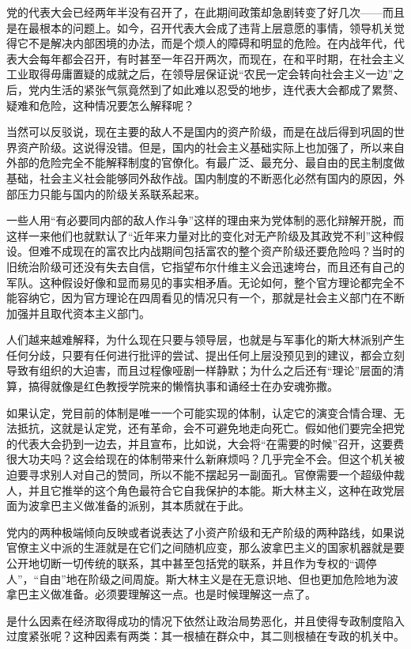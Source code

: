 \documentclass[UTF8, 12pt, a4paper]{ctexrep}
\begin{document}
党的代表大会已经两年半没有召开了，在此期间政策却急剧转变了好几次——而且是在最根本的问题上。如今，召开代表大会成了违背上层意愿的事情，领导机关觉得它不是解决内部困境的办法，而是个烦人的障碍和明显的危险。在内战年代，代表大会每年都会召开，有时甚至一年召开两次，而现在，在和平时期，在社会主义工业取得毋庸置疑的成就之后，在领导层保证说“农民一定会转向社会主义一边”之后，党内生活的紧张气氛竟然到了如此难以忍受的地步，连代表大会都成了累赘、疑难和危险，这种情况要怎么解释呢？

当然可以反驳说，现在主要的敌人不是国内的资产阶级，而是在战后得到巩固的世界资产阶级。这说得没错。但是，国内的社会主义基础实际上也加强了，所以来自外部的危险完全不能解释制度的官僚化。有最广泛、最充分、最自由的民主制度做基础，社会主义社会能够同外敌作战。国内制度的不断恶化必然有国内的原因，外部压力只能与国内的阶级关系联系起来。

一些人用“有必要同内部的敌人作斗争”这样的理由来为党体制的恶化辩解开脱，而这样一来他们也就默认了“近年来力量对比的变化对无产阶级及其政党不利”这种假设。但难不成现在的富农比内战期间包括富农的整个资产阶级还要危险吗？当时的旧统治阶级可还没有失去自信，它指望布尔什维主义会迅速垮台，而且还有自己的军队。这种假设好像和显而易见的事实相矛盾。无论如何，整个官方理论都完全不能容纳它，因为官方理论在四周看见的情况只有一个，那就是社会主义部门在不断加强并且取代资本主义部门。

人们越来越难解释，为什么现在只要与领导层，也就是与军事化的斯大林派别产生任何分歧，只要有任何进行批评的尝试、提出任何上层没预见到的建议，都会立刻导致有组织的大迫害，而且过程像哑剧一样静默；为什么之后还有“理论”层面的清算，搞得就像是红色教授学院来的懒惰执事和诵经士在办安魂弥撒。

如果认定，党目前的体制是唯一一个可能实现的体制，认定它的演变合情合理、无法抵抗，这就是认定党，还有革命，会不可避免地走向死亡。假如他们要完全把党的代表大会扔到一边去，并且宣布，比如说，大会将“在需要的时候”召开，这要费很大功夫吗？这会给现在的体制带来什么新麻烦吗？几乎完全不会。但这个机关被迫要寻求别人对自己的赞同，所以不能不摆起另一副面孔。官僚需要一个超级仲裁人，并且它推举的这个角色最符合它自我保护的本能。斯大林主义，这种在政党层面为波拿巴主义做准备的派别，其本质就在于此。

党内的两种极端倾向反映或者说表达了小资产阶级和无产阶级的两种路线，如果说官僚主义中派的生涯就是在它们之间随机应变，那么波拿巴主义的国家机器就是要公开地切断一切传统的联系，其中甚至包括党的联系，并且作为专权的“调停人”，“自由”地在阶级之间周旋。斯大林主义是在无意识地、但也更加危险地为波拿巴主义做准备。必须要理解这一点。也是时候理解这一点了。

是什么因素在经济取得成功的情况下依然让政治局势恶化，并且使得专政制度陷入过度紧张呢？这种因素有两类：其一根植在群众中，其二则根植在专政的机关中。
\end{document}
